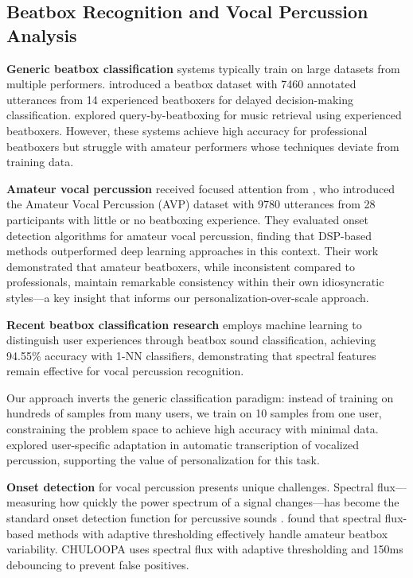 \documentclass{aimc2026}
\begin{document}
\subsection{Beatbox Recognition and Vocal Percussion Analysis}

\textbf{Generic beatbox classification} systems typically train on large datasets from multiple performers. \citet{stowell2010beatbox} introduced a beatbox dataset with 7460 annotated utterances from 14 experienced beatboxers for delayed decision-making classification. \citet{kapur2004query} explored query-by-beatboxing for music retrieval using experienced beatboxers. However, these systems achieve high accuracy for professional beatboxers but struggle with amateur performers whose techniques deviate from training data.

\textbf{Amateur vocal percussion} received focused attention from \citet{delgado2019dataset}, who introduced the Amateur Vocal Percussion (AVP) dataset with 9780 utterances from 28 participants with little or no beatboxing experience. They evaluated onset detection algorithms for amateur vocal percussion, finding that DSP-based methods outperformed deep learning approaches in this context. Their work demonstrated that amateur beatboxers, while inconsistent compared to professionals, maintain remarkable consistency within their own idiosyncratic styles---a key insight that informs our personalization-over-scale approach.

\textbf{Recent beatbox classification research} \citep{martanto2025beatbox} employs machine learning to distinguish user experiences through beatbox sound classification, achieving 94.55\% accuracy with 1-NN classifiers, demonstrating that spectral features remain effective for vocal percussion recognition.

Our approach inverts the generic classification paradigm: instead of training on hundreds of samples from many users, we train on 10 samples from one user, constraining the problem space to achieve high accuracy with minimal data. \citet{ramires2018user} explored user-specific adaptation in automatic transcription of vocalized percussion, supporting the value of personalization for this task.

\textbf{Onset detection} for vocal percussion presents unique challenges. Spectral flux---measuring how quickly the power spectrum of a signal changes---has become the standard onset detection function for percussive sounds \citep{bello2005tutorial}. \citet{delgado2019dataset} found that spectral flux-based methods with adaptive thresholding effectively handle amateur beatbox variability. CHULOOPA uses spectral flux with adaptive thresholding and 150ms debouncing to prevent false positives.
\end{document}
